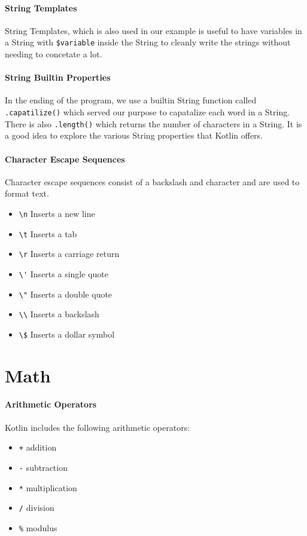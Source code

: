 \paragraph{String Templates}
String Templates, which is also used in our example is useful to have variables in a String with \verb!$variable!
inside the String to cleanly write the strings without needing to concetate a lot.  

\paragraph{String Builtin Properties}
In the ending of the program, we use a builtin String function called \verb!.capatilize()! which served our
purpose to capatalize each word in a String. There is also \verb!.length()! which returns the number of characters in a String. 
It is a good idea to explore the various String properties that Kotlin offers. 

\paragraph{Character Escape Sequences}
Character escape sequences consist of a backslash and character and are used to format text.

\begin{itemize}
    \item \verb!\n! Inserts a new line
    \item \verb!\t! Inserts a tab
    \item \verb!\r! Inserts a carriage return
    \item \verb!\'! Inserts a single quote
    \item \verb!\"! Inserts a double quote
    \item \verb!\\! Inserts a backslash
    \item \verb!\$! Inserts a dollar symbol
\end{itemize}

\section{Math}
\paragraph{Arithmetic Operators}
Kotlin includes the following arithmetic operators: 
\begin{itemize}
    \item \verb!+! addition
    \item \verb!-! subtraction
    \item \verb!*! multiplication
    \item \verb!/! division
    \item \verb!%! modulus
\end{itemize}

